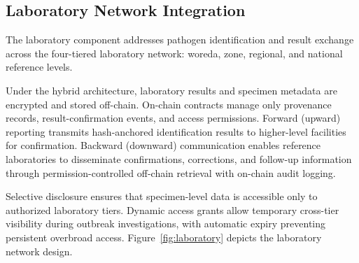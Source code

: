 %
%
%
%
%
%

\subsection{Laboratory Network Integration}\label{subsec:laboratory}

The laboratory component addresses pathogen identification and result exchange across the four-tiered laboratory network: woreda, zone, regional, and national reference levels.

Under the hybrid architecture, laboratory results and specimen metadata are encrypted and stored off-chain. On-chain contracts manage only provenance records, result-confirmation events, and access permissions. Forward (upward) reporting transmits hash-anchored identification results to higher-level facilities for confirmation. Backward (downward) communication enables reference laboratories to disseminate confirmations, corrections, and follow-up information through permission-controlled off-chain retrieval with on-chain audit logging.

Selective disclosure ensures that specimen-level data is accessible only to authorized laboratory tiers. Dynamic access grants allow temporary cross-tier visibility during outbreak investigations, with automatic expiry preventing persistent overbroad access. Figure~\ref{fig:laboratory} depicts the laboratory network design.

